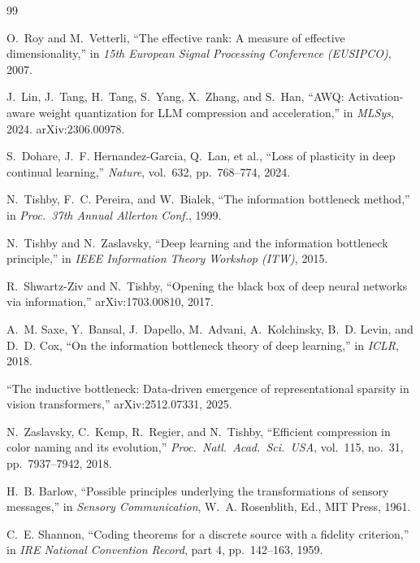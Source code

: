 \documentclass[11pt,a4paper]{article}
\begin{document}
\newpage
\begin{thebibliography}{99}

O.~Roy and M.~Vetterli, ``The effective rank: A measure of effective dimensionality,'' in \textit{15th European Signal Processing Conference (EUSIPCO)}, 2007.

J.~Lin, J.~Tang, H.~Tang, S.~Yang, X.~Zhang, and S.~Han, ``AWQ: Activation-aware weight quantization for LLM compression and acceleration,'' in \textit{MLSys}, 2024. arXiv:2306.00978.

S.~Dohare, J.~F. Hernandez-Garcia, Q.~Lan, et al., ``Loss of plasticity in deep continual learning,'' \textit{Nature}, vol.~632, pp.~768--774, 2024.

N.~Tishby, F.~C. Pereira, and W.~Bialek, ``The information bottleneck method,'' in \textit{Proc.\ 37th Annual Allerton Conf.}, 1999.

N.~Tishby and N.~Zaslavsky, ``Deep learning and the information bottleneck principle,'' in \textit{IEEE Information Theory Workshop (ITW)}, 2015.

R.~Shwartz-Ziv and N.~Tishby, ``Opening the black box of deep neural networks via information,'' arXiv:1703.00810, 2017.

A.~M. Saxe, Y.~Bansal, J.~Dapello, M.~Advani, A.~Kolchinsky, B.~D. Levin, and D.~D. Cox, ``On the information bottleneck theory of deep learning,'' in \textit{ICLR}, 2018.

``The inductive bottleneck: Data-driven emergence of representational sparsity in vision transformers,'' arXiv:2512.07331, 2025.

N.~Zaslavsky, C.~Kemp, R.~Regier, and N.~Tishby, ``Efficient compression in color naming and its evolution,'' \textit{Proc.\ Natl.\ Acad.\ Sci.\ USA}, vol.~115, no.~31, pp.~7937--7942, 2018.

H.~B. Barlow, ``Possible principles underlying the transformations of sensory messages,'' in \textit{Sensory Communication}, W.~A. Rosenblith, Ed., MIT Press, 1961.

C.~E. Shannon, ``Coding theorems for a discrete source with a fidelity criterion,'' in \textit{IRE National Convention Record}, part 4, pp.~142--163, 1959.


\end{thebibliography}
\end{document}
